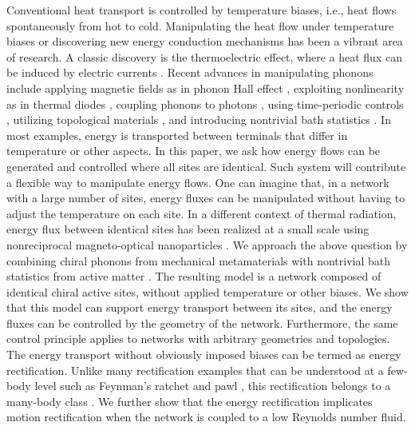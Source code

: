 \documentclass[
 preprint,
 preprintnumbers,
 amsmath,amssymb,
 aps,
 pre,
 longbibliography,
 superscriptaddress,
 10pt, twocolumn
]{revtex4-1}
\begin{document}
Conventional heat transport is controlled by temperature biases, i.e., heat flows spontaneously from hot to cold.
Manipulating the heat flow under temperature biases or discovering new energy conduction mechanisms has been a vibrant area of research.
A classic discovery is the thermoelectric effect, where a heat flux can be induced by electric currents \cite{Dubi2011ColloquiumHeat}.
Recent advances in manipulating phonons include applying magnetic fields as in phonon Hall effect \cite{Strohm2005PhenomenologicalEvidence,Li2012ColloquiumPhononics}, exploiting nonlinearity as in thermal diodes \cite{Terraneo2002ControllingEnergy,Li2012ColloquiumPhononics}, coupling phonons to photons \cite{Seif2017ThermalManagement,Safavi-Naeini2019ControllingPhonons}, using time-periodic controls \cite{Li2008RatchetingHeat,Ren2010EmergenceControl,Ren2012GeometricHeat}, utilizing topological materials \cite{Rivas2017TopologicalHeat,Ronetti2017PolarizedHeat,Liu2017ModelTopological,Chien2018TopologicalQuantization}, and introducing nontrivial bath statistics \cite{Kanazawa2013HeatConduction,Morgado2016ThermostatisticsSmall,Martinez2017ColloidalHeat}.
In most examples, energy is transported between terminals that differ in temperature or other aspects.
In this paper, we ask how energy flows can be generated and controlled where all sites are identical. Such system will contribute a flexible way to manipulate energy flows. One can imagine that, in a network with a large number of sites, energy fluxes can be manipulated without having to adjust the temperature on each site.
In a different context of thermal radiation, energy flux between identical sites has been realized at a small scale using nonreciprocal magneto-optical nanoparticles \cite{Zhu2016PersistentDirectional,Zhu2018TheoryManybody,Ott2018CircularHeat}.
We approach the above question by combining chiral phonons from mechanical metamaterials \cite{Nash2015TopologicalMechanics} with nontrivial bath statistics from active matter \cite{Fodor2016HowFar}.
The resulting model is a network composed of identical chiral active sites, without applied temperature or other biases.
We show that this model can support energy transport between its sites, and the energy fluxes can be controlled by the geometry of the network. Furthermore, the same control principle applies to networks with arbitrary geometries and topologies.
The energy transport without obviously imposed biases can be termed as energy rectification. Unlike many rectification examples that can be understood at a few-body level such as Feynman's ratchet and pawl \cite{Feynman2015FeynmanLectures,Reimann2002BrownianMotors,Martinez2017ColloidalHeat}, this rectification belongs to a many-body class \cite{Asban2014NopumpingTheorem,Reichhardt2017RatchetEffects}. We further show that the energy rectification implicates motion rectification when the network is coupled to a low Reynolds number fluid.
\end{document}
